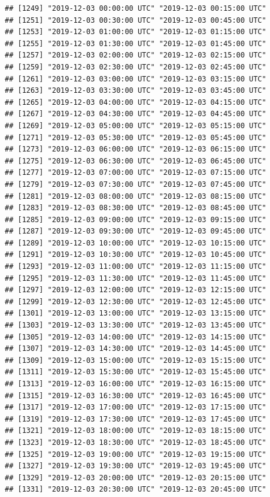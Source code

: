 \documentclass{article}\usepackage[]{graphicx}\usepackage[]{color}
\makeatletter
\newenvironment{kframe}{%
 \def\at@end@of@kframe{}%
 \ifinner\ifhmode%
  \def\at@end@of@kframe{\end{minipage}}%
  \begin{minipage}{\columnwidth}%
 \fi\fi%
 \def\FrameCommand##1{\hskip\@totalleftmargin \hskip-\fboxsep
 \colorbox{shadecolor}{##1}\hskip-\fboxsep
     \hskip-\linewidth \hskip-\@totalleftmargin \hskip\columnwidth}%
 \MakeFramed {\advance\hsize-\width
   \@totalleftmargin\z@ \linewidth\hsize
   \@setminipage}}%
 {\par\unskip\endMakeFramed%
 \at@end@of@kframe}
\newenvironment{knitrout}{}{} %
\makeatother
\begin{document}
\begin{knitrout}
\begin{kframe}
\begin{verbatim}
## [1249] "2019-12-03 00:00:00 UTC" "2019-12-03 00:15:00 UTC"
## [1251] "2019-12-03 00:30:00 UTC" "2019-12-03 00:45:00 UTC"
## [1253] "2019-12-03 01:00:00 UTC" "2019-12-03 01:15:00 UTC"
## [1255] "2019-12-03 01:30:00 UTC" "2019-12-03 01:45:00 UTC"
## [1257] "2019-12-03 02:00:00 UTC" "2019-12-03 02:15:00 UTC"
## [1259] "2019-12-03 02:30:00 UTC" "2019-12-03 02:45:00 UTC"
## [1261] "2019-12-03 03:00:00 UTC" "2019-12-03 03:15:00 UTC"
## [1263] "2019-12-03 03:30:00 UTC" "2019-12-03 03:45:00 UTC"
## [1265] "2019-12-03 04:00:00 UTC" "2019-12-03 04:15:00 UTC"
## [1267] "2019-12-03 04:30:00 UTC" "2019-12-03 04:45:00 UTC"
## [1269] "2019-12-03 05:00:00 UTC" "2019-12-03 05:15:00 UTC"
## [1271] "2019-12-03 05:30:00 UTC" "2019-12-03 05:45:00 UTC"
## [1273] "2019-12-03 06:00:00 UTC" "2019-12-03 06:15:00 UTC"
## [1275] "2019-12-03 06:30:00 UTC" "2019-12-03 06:45:00 UTC"
## [1277] "2019-12-03 07:00:00 UTC" "2019-12-03 07:15:00 UTC"
## [1279] "2019-12-03 07:30:00 UTC" "2019-12-03 07:45:00 UTC"
## [1281] "2019-12-03 08:00:00 UTC" "2019-12-03 08:15:00 UTC"
## [1283] "2019-12-03 08:30:00 UTC" "2019-12-03 08:45:00 UTC"
## [1285] "2019-12-03 09:00:00 UTC" "2019-12-03 09:15:00 UTC"
## [1287] "2019-12-03 09:30:00 UTC" "2019-12-03 09:45:00 UTC"
## [1289] "2019-12-03 10:00:00 UTC" "2019-12-03 10:15:00 UTC"
## [1291] "2019-12-03 10:30:00 UTC" "2019-12-03 10:45:00 UTC"
## [1293] "2019-12-03 11:00:00 UTC" "2019-12-03 11:15:00 UTC"
## [1295] "2019-12-03 11:30:00 UTC" "2019-12-03 11:45:00 UTC"
## [1297] "2019-12-03 12:00:00 UTC" "2019-12-03 12:15:00 UTC"
## [1299] "2019-12-03 12:30:00 UTC" "2019-12-03 12:45:00 UTC"
## [1301] "2019-12-03 13:00:00 UTC" "2019-12-03 13:15:00 UTC"
## [1303] "2019-12-03 13:30:00 UTC" "2019-12-03 13:45:00 UTC"
## [1305] "2019-12-03 14:00:00 UTC" "2019-12-03 14:15:00 UTC"
## [1307] "2019-12-03 14:30:00 UTC" "2019-12-03 14:45:00 UTC"
## [1309] "2019-12-03 15:00:00 UTC" "2019-12-03 15:15:00 UTC"
## [1311] "2019-12-03 15:30:00 UTC" "2019-12-03 15:45:00 UTC"
## [1313] "2019-12-03 16:00:00 UTC" "2019-12-03 16:15:00 UTC"
## [1315] "2019-12-03 16:30:00 UTC" "2019-12-03 16:45:00 UTC"
## [1317] "2019-12-03 17:00:00 UTC" "2019-12-03 17:15:00 UTC"
## [1319] "2019-12-03 17:30:00 UTC" "2019-12-03 17:45:00 UTC"
## [1321] "2019-12-03 18:00:00 UTC" "2019-12-03 18:15:00 UTC"
## [1323] "2019-12-03 18:30:00 UTC" "2019-12-03 18:45:00 UTC"
## [1325] "2019-12-03 19:00:00 UTC" "2019-12-03 19:15:00 UTC"
## [1327] "2019-12-03 19:30:00 UTC" "2019-12-03 19:45:00 UTC"
## [1329] "2019-12-03 20:00:00 UTC" "2019-12-03 20:15:00 UTC"
## [1331] "2019-12-03 20:30:00 UTC" "2019-12-03 20:45:00 UTC"

\end{verbatim}
\end{kframe}
\end{knitrout}
\end{document}
